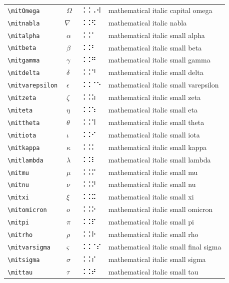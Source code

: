 \documentclass[oneside]{article}
\begin{document}
\begin{longtable}{llll}
\verb|\mitOmega| & $\mitOmega$ &  ⠨⠨⠠⠺  & {mathematical italic capital omega} \\[2ex]
\verb|\mitnabla| & $\mitnabla$ &  ⠨⠨⠫  & {mathematical italic nabla} \\[2ex]
\verb|\mitalpha| & $\mitalpha$ &  ⠨⠨⠁  & {mathematical italic small alpha} \\[2ex]
\verb|\mitbeta| & $\mitbeta$ &  ⠨⠨⠃  & {mathematical italic small beta} \\[2ex]
\verb|\mitgamma| & $\mitgamma$ &  ⠨⠨⠛  & {mathematical italic small gamma} \\[2ex]
\verb|\mitdelta| & $\mitdelta$ &  ⠨⠨⠙  & {mathematical italic small delta} \\[2ex]
\verb|\mitvarepsilon| & $\mitvarepsilon$ &  ⠨⠨⠈⠑  & {mathematical italic small varepsilon} \\[2ex]
\verb|\mitzeta| & $\mitzeta$ &  ⠨⠨⠵  & {mathematical italic small zeta} \\[2ex]
\verb|\miteta| & $\miteta$ &  ⠨⠨⠱  & {mathematical italic small eta} \\[2ex]
\verb|\mittheta| & $\mittheta$ &  ⠨⠨⠹  & {mathematical italic small theta} \\[2ex]
\verb|\mitiota| & $\mitiota$ &  ⠨⠨⠊  & {mathematical italic small iota} \\[2ex]
\verb|\mitkappa| & $\mitkappa$ &  ⠨⠨⠅  & {mathematical italic small kappa} \\[2ex]
\verb|\mitlambda| & $\mitlambda$ &  ⠨⠨⠇  & {mathematical italic small lambda} \\[2ex]
\verb|\mitmu| & $\mitmu$ &  ⠨⠨⠍  & {mathematical italic small mu} \\[2ex]
\verb|\mitnu| & $\mitnu$ &  ⠨⠨⠝  & {mathematical italic small nu} \\[2ex]
\verb|\mitxi| & $\mitxi$ &  ⠨⠨⠭  & {mathematical italic small xi} \\[2ex]
\verb|\mitomicron| & $\mitomicron$ &  ⠨⠨⠕  & {mathematical italic small omicron} \\[2ex]
\verb|\mitpi| & $\mitpi$ &  ⠨⠨⠏  & {mathematical italic small pi} \\[2ex]
\verb|\mitrho| & $\mitrho$ &  ⠨⠨⠗  & {mathematical italic small rho} \\[2ex]
\verb|\mitvarsigma| & $\mitvarsigma$ &  ⠨⠨⠈⠎  & {mathematical italic small final sigma} \\[2ex]
\verb|\mitsigma| & $\mitsigma$ &  ⠨⠨⠎  & {mathematical italic small sigma} \\[2ex]
\verb|\mittau| & $\mittau$ &  ⠨⠨⠞  & {mathematical italic small tau} \\[2ex]

\end{longtable}
\end{document}
